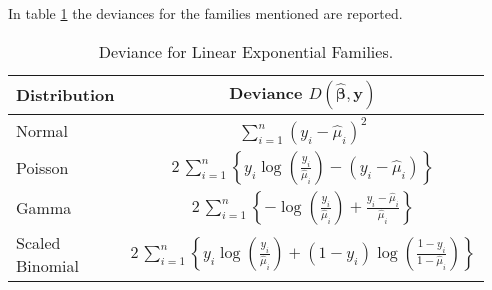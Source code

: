\documentclass[a4paper, twoside, openright, 12pt]{report}
\newcommand*{\bibtitle}{Bibliography}
\theoremstyle{definition}
\theoremstyle{definition}
\theoremstyle{definition}
\theoremstyle{remark}
\begin{document}
In table \ref{tab:deviance} the deviances for the families mentioned are reported.

\begin{table}[!h]

\caption{\label{tab:deviance}Deviance for Linear Exponential Families.}
\centering
\begin{tabular}[t]{lc}
\toprule
\textbf{Distribution} & \textbf{Deviance $D(\hat{\boldsymbol{\beta}}, \boldsymbol{y})$}\\
\midrule[\heavyrulewidth]
Normal & $\sum_{i=1}^{n}{\left( y_i - \hat{\mu}_i \right)^2}$\\
\addlinespace\hline\addlinespace
Poisson & $2\,\sum_{i=1}^{n}{\left\{ y_i \log{\left(\frac{y_i}{\hat{\mu}_i}\right)} - \left( y_i - \hat{\mu}_i \right) \right\}}$\\
\addlinespace\hline\addlinespace
Gamma & $2\,\sum_{i=1}^{n}{\left\{ - \log{\left(\frac{y_i}{\hat{\mu}_i}\right)} + \frac{ y_i - \hat{\mu}_i }{\hat{\mu}_i} \right\}}$\\
\addlinespace\hline\addlinespace
\makecell[l]{Scaled\\Binomial} & $2\,\sum_{i=1}^{n}{\left\{ y_i \log{\left(\frac{y_i}{\hat{\mu}_i}\right)}+ \left(1-y_i\right) \log{\left(\frac{1-y_i}{1-\hat{\mu}_i}\right)} \right\}}$\\
\bottomrule
\end{tabular}
\end{table}


\nocite{*}

\setlength{\baselineskip}{0pt} %

{\renewcommand*\MakeUppercase[1]{#1}%
\printbibliography[heading=bibintoc,title={\bibtitle}]}
\end{document}
